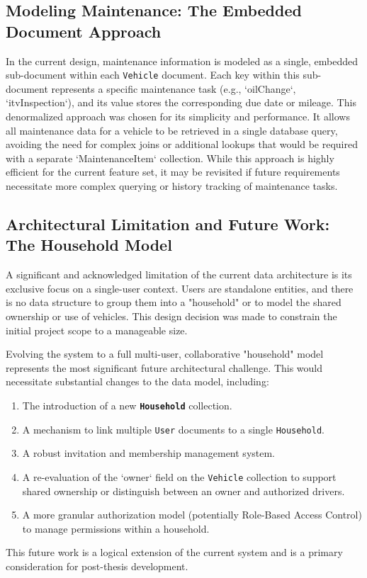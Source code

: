 
\subsection{Modeling Maintenance: The Embedded Document Approach}
In the current design, maintenance information is modeled as a single, embedded sub-document within each \texttt{Vehicle} document. Each key within this sub-document represents a specific maintenance task (e.g., `oilChange`, `itvInspection`), and its value stores the corresponding due date or mileage. This denormalized approach was chosen for its simplicity and performance. It allows all maintenance data for a vehicle to be retrieved in a single database query, avoiding the need for complex joins or additional lookups that would be required with a separate `MaintenanceItem` collection. While this approach is highly efficient for the current feature set, it may be revisited if future requirements necessitate more complex querying or history tracking of maintenance tasks.

\subsection{Architectural Limitation and Future Work: The Household Model}
A significant and acknowledged limitation of the current data architecture is its exclusive focus on a single-user context. Users are standalone entities, and there is no data structure to group them into a "household" or to model the shared ownership or use of vehicles. This design decision was made to constrain the initial project scope to a manageable size.

\textgap

Evolving the system to a full multi-user, collaborative "household" model represents the most significant future architectural challenge. This would necessitate substantial changes to the data model, including:
\begin{enumerate}
    \item The introduction of a new \textbf{\texttt{Household}} collection.
    \item A mechanism to link multiple \texttt{User} documents to a single \texttt{Household}.
    \item A robust invitation and membership management system.
    \item A re-evaluation of the `owner` field on the \texttt{Vehicle} collection to support shared ownership or distinguish between an owner and authorized drivers.
    \item A more granular authorization model (potentially Role-Based Access Control) to manage permissions within a household.
\end{enumerate}
This future work is a logical extension of the current system and is a primary consideration for post-thesis development.

